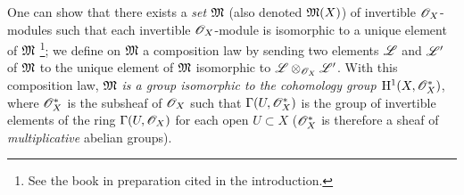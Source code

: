 \begin{env}[5.4.7]
\label{0.5.4.7}
One can show that there exists a \emph{set} $\mathfrak{M}$ (also denoted $\mathfrak{M}(X)$) of invertible $\mathscr{O}_X$-modules such that each invertible $\mathscr{O}_X$-module is isomorphic to a unique element of $\mathfrak{M}$
\footnote{See the book in preparation cited in the introduction.};
we define on $\mathfrak{M}$ a composition law by sending two elements $\mathscr{L}$ and $\mathscr{L}'$ of $\mathfrak{M}$ to the unique element of $\mathfrak{M}$ isomorphic to $\mathscr{L}\otimes_{\mathscr{O}_X}\mathscr{L}'$.
With this composition law, \emph{$\mathfrak{M}$ is a group isomorphic to the cohomology group $\mathrm{H}^1(X,\mathscr{O}_X^*)$}, where $\mathscr{O}_X^*$ is the subsheaf of $\mathscr{O}_X$ such that $\Gamma(U,\mathscr{O}_X^*)$ is the group of invertible elements of the ring $\Gamma(U,\mathscr{O}_X)$ for each open $U\subset X$ ($\mathscr{O}_X^*$ is therefore a sheaf of \emph{multiplicative} abelian groups).


\end{env}
